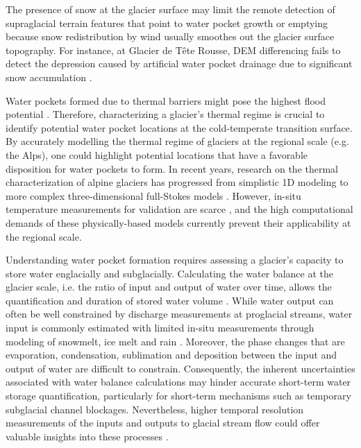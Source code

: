 The presence of snow at the glacier surface may limit the remote detection of supraglacial terrain features that point to water pocket growth or emptying because snow redistribution by wind usually smoothes out the glacier surface topography. For instance, at Glacier de Tête Rousse, DEM differencing fails to detect the depression caused by artificial water pocket drainage due to significant snow accumulation \citep{Gagliardini&al2011}.

Water pockets formed due to thermal barriers might pose the highest flood potential \citep{Vincent&al2010b}. Therefore, characterizing a glacier's thermal regime is crucial to identify potential water pocket locations at the cold-temperate transition surface. By accurately modelling the thermal regime of glaciers at the regional scale (e.g. the Alps), one could highlight potential locations that have a favorable disposition for water pockets to form. In recent years, research on the thermal characterization of alpine glaciers has progressed from simplistic 1D modeling \citep[e.g.][]{Gilbert&al2014,Huss&Fischer2016} to more complex three-dimensional full-Stokes models \citep[e.g.][]{Gilbert&al2015}. However, in-situ temperature measurements for validation are scarce \citep[e.g.][for the Swiss Alps]{Luthi&Funk2001,Huss&Fischer2016}, and the high computational demands of these physically-based models currently prevent their applicability at the regional scale.

Understanding water pocket formation requires assessing a glacier's capacity to store water englacially and subglacially. Calculating the water balance at the glacier scale, i.e. the ratio of input and output of water over time, allows the quantification and duration of stored water volume \citep[see][for a review on glacier storage concepts]{Jansson&al2003}. While water output can often be well constrained by discharge measurements at proglacial streams, water input is commonly estimated with limited in-situ measurements through modeling of snowmelt, ice melt and rain \citep[e.g.][]{Hock2005}. Moreover, the phase changes that are evaporation, condensation, sublimation and deposition between the input and output of water are difficult to constrain. Consequently, the inherent uncertainties associated with water balance calculations may hinder accurate short-term water storage quantification, particularly for short-term mechanisms such as temporary subglacial channel blockages. Nevertheless, higher temporal resolution measurements of the inputs and outputs to glacial stream flow could offer valuable insights into these processes \citep[e.g.][]{Muller&al2024b}.



